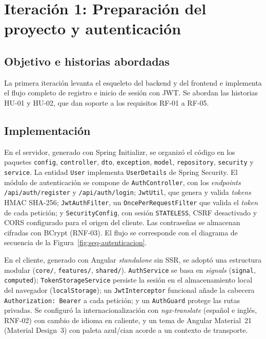 \section{Iteración 1: Preparación del proyecto y autenticación}
\label{sec:iteracion-1}

\subsection{Objetivo e historias abordadas}

La primera iteración levanta el esqueleto del backend y del frontend e implementa el flujo completo de registro e inicio de sesión con JWT. Se abordan las historias HU-01 y HU-02, que dan soporte a los requisitos RF-01 a RF-05.

\subsection{Implementación}

En el servidor, generado con Spring Initializr, se organizó el código en los paquetes \texttt{config}, \texttt{controller}, \texttt{dto}, \texttt{exception}, \texttt{model}, \texttt{repository}, \texttt{security} y \texttt{service}. La entidad \texttt{User} implementa \texttt{UserDetails} de Spring Security. El módulo de autenticación se compone de \texttt{AuthController}, con los \textit{endpoints} \texttt{/api/auth/register} y \texttt{/api/auth/login}; \texttt{JwtUtil}, que genera y valida \textit{tokens} HMAC SHA-256; \texttt{JwtAuthFilter}, un \texttt{OncePerRequestFilter} que valida el \textit{token} de cada petición; y \texttt{SecurityConfig}, con sesión \texttt{STATELESS}, CSRF desactivado y CORS configurado para el origen del cliente. Las contraseñas se almacenan cifradas con BCrypt (RNF-03). El flujo se corresponde con el diagrama de secuencia de la Figura~\ref{fig:seq-autenticacion}.

En el cliente, generado con Angular \textit{standalone} sin SSR, se adoptó una estructura modular (\texttt{core/}, \texttt{features/}, \texttt{shared/}). \texttt{AuthService} se basa en \textit{signals} (\texttt{signal}, \texttt{computed}); \texttt{TokenStorageService} persiste la sesión en el almacenamiento local del navegador (\texttt{localStorage}); un \texttt{JwtInterceptor} funcional añade la cabecera \texttt{Authorization: Bearer} a cada petición; y un \texttt{AuthGuard} protege las rutas privadas. Se configuró la internacionalización con \textit{ngx-translate} (español e inglés, RNF-02) con cambio de idioma en caliente, y un tema de Angular Material~21 (Material Design~3) con paleta azul/cian acorde a un contexto de transporte.

